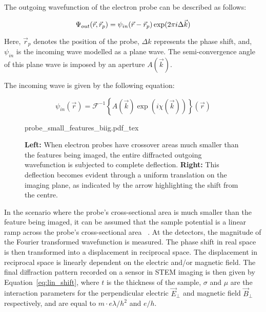 The outgoing wavefunction of the electron probe can be described as follows:

\begin{equation}
    \Psi_{out}(\vec{r},\vec{r}_p)=\psi_{in}(\vec{r}-\vec{r}_p)\exp(2\pi i \Delta \vec{k})\\
    \label{eq:out_wav}
\end{equation}

Here, $\vec{r}_p$ denotes the position of the probe, $\Delta k$ represents the phase shift, and, $\psi_{in}$ is the incoming wave modelled as a plane wave. The semi-convergence angle of this plane wave is imposed by an aperture $A(\vec{k})$.

The incoming wave is given by the following equation:

\begin{equation}
    \psi_{in}(\vec{r})=\mathcal{F}^{-1}\left\{A(\vec{k})\exp(i\chi(\vec{k}))\right\}(\vec{r})
    \label{eq:in_wav}
\end{equation}




\begin{figure}[h]
	\centering
	\def\svgwidth{1\linewidth}
	{probe_small_features_biig.pdf_tex}
    \caption{\textbf{Left:} When electron probes have crossover areas much smaller than the features being imaged, the entire diffracted outgoing wavefunction is subjected to complete deflection. \textbf{Right:} This deflection becomes evident through a uniform translation on the imaging plane, as indicated by the arrow highlighting the shift from the centre.}
	\label{fig:small_probe}
\end{figure}

In the scenario where the probe's cross-sectional area is much smaller than the feature being imaged, it can be assumed that the sample potential is a linear ramp across the probe's cross-sectional area ~\cite{caoTheoryPracticeElectron2018}. 
%
At the detectors, the magnitude of the Fourier transformed wavefunction is measured. The phase shift in real space is then transformed into a displacement in reciprocal space.
%
The displacement in reciprocal space is linearly dependent on the electric and/or magnetic field. The final diffraction pattern recorded on a sensor in STEM imaging is then given by Equation~\ref{eq:lin_shift}, where $t$ is the thickness of the sample, $\sigma$ and $\mu$ are the interaction parameters for the perpendicular electric $\vec{E}_{\perp}$ and magnetic field $\vec{B}_{\perp}$ respectively, and are equal to $m\cdot e \lambda / h^ 2$ and $e / h$. 

